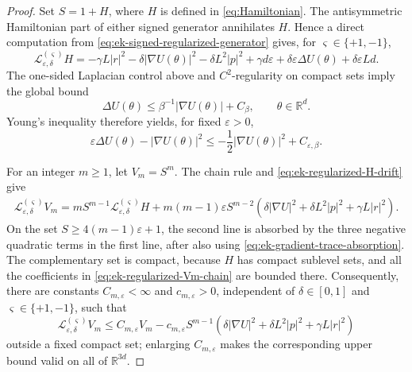 \documentclass[11pt]{article}
\numberwithin{equation}{section}
\theoremstyle{plain}
\theoremstyle{definition}
\theoremstyle{remark}
\newcommand{\R}{\mathbb R}
\newcommand{\eps}{\varepsilon}
\newcommand{\calL}{\mathcal L}
\begin{document}
\begin{proof}
Set $S=1+H$, where $H$ is defined in \eqref{eq:Hamiltonian}.  The
antisymmetric Hamiltonian part of either signed generator annihilates $H$.
Hence a direct computation from
\eqref{eq:ek-signed-regularized-generator} gives, for
$\varsigma\in\{+1,-1\}$,
\begin{equation}
\label{eq:ek-regularized-H-drift}
\calL_{\eps,\delta}^{(\varsigma)}H
=-\gamma L|r|^2-\delta|\nabla U(\theta)|^2
  -\delta L^2|p|^2
  +\gamma d\eps+\delta\eps\Delta U(\theta)+\delta\eps Ld.
\end{equation}
The one-sided Laplacian control above and $C^2$-regularity on compact sets
imply the global bound
\begin{equation}
\label{eq:ek-laplacian-gradient-bound}
\Delta U(\theta)\le \beta^{-1}|\nabla U(\theta)|+C_\beta,
\qquad \theta\in\R^d.
\end{equation}
Young's inequality therefore yields, for fixed $\eps>0$,
\begin{equation}
\label{eq:ek-gradient-trace-absorption}
\eps\Delta U(\theta)-|\nabla U(\theta)|^2
\le-\frac12|\nabla U(\theta)|^2+C_{\eps,\beta}.
\end{equation}

For an integer $m\ge1$, let $V_m=S^m$.  The chain rule and
\eqref{eq:ek-regularized-H-drift} give
\begin{align}
\calL_{\eps,\delta}^{(\varsigma)}V_m
=mS^{m-1}\calL_{\eps,\delta}^{(\varsigma)}H
+m(m-1)\eps S^{m-2}
\left(\delta|\nabla U|^2+\delta L^2|p|^2+\gamma L|r|^2\right).
\label{eq:ek-regularized-Vm-chain}
\end{align}
On the set $S\ge 4(m-1)\eps+1$, the second line is absorbed by the three
negative quadratic terms in the first line, after also using
\eqref{eq:ek-gradient-trace-absorption}.  The complementary set is compact,
because $H$ has compact sublevel sets, and all the coefficients in
\eqref{eq:ek-regularized-Vm-chain} are bounded there.  Consequently, there
are constants $C_{m,\eps}<\infty$ and $c_{m,\eps}>0$, independent of
$\delta\in[0,1]$ and $\varsigma\in\{+1,-1\}$, such that
\begin{equation}
\label{eq:ek-regularized-Vm-drift}
\calL_{\eps,\delta}^{(\varsigma)}V_m
\le C_{m,\eps}V_m
-c_{m,\eps}S^{m-1}
\left(\delta|\nabla U|^2+\delta L^2|p|^2+\gamma L|r|^2\right)
\end{equation}
outside a fixed compact set; enlarging $C_{m,\eps}$ makes the corresponding
upper bound valid on all of $\R^{3d}$.


\end{proof}
\end{document}
